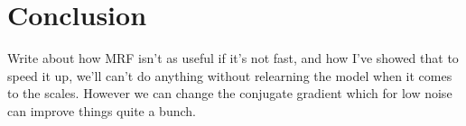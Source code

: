 \documentclass{article}
\begin{document}





\section{Conclusion}

Write about how MRF isn't as useful if it's not fast, and how I've 
showed that to speed it up, we'll can't do anything without relearning 
the model when it comes to the scales. However we can change the 
conjugate gradient which for low noise can improve things quite a bunch.

% 

% 

% 

% 

%
%  

% 




\end{document}
